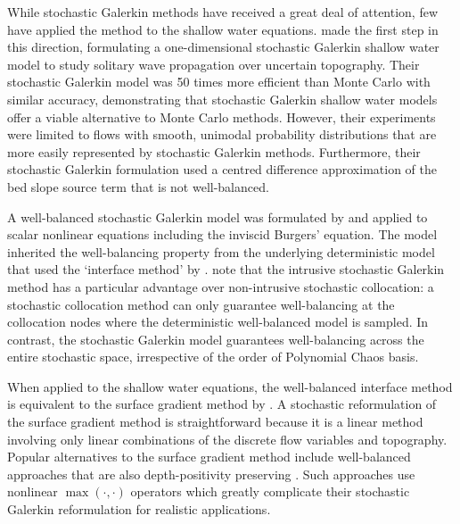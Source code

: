 While stochastic Galerkin methods have received a great deal of attention, few have applied the method to the shallow water equations.
\citet{ge2008} made the first step in this direction, formulating a one-dimensional stochastic Galerkin shallow water model to study solitary wave propagation over uncertain topography.
Their stochastic Galerkin model was 50 times more efficient than Monte Carlo with similar accuracy, demonstrating that stochastic Galerkin shallow water models offer a viable alternative to Monte Carlo methods.
However, their experiments were limited to flows with smooth, unimodal probability distributions that are more easily represented by stochastic Galerkin methods.
Furthermore, their stochastic Galerkin formulation used a centred difference approximation of the bed slope source term that is not well-balanced.

A well-balanced stochastic Galerkin model was formulated by \citet{jin2016} and applied to scalar nonlinear equations including the inviscid Burgers' equation.
The model inherited the well-balancing property from the underlying deterministic model that used the `interface method' by \citet{jin2001}.
\citet{jin2016} note that the intrusive stochastic Galerkin method has a particular advantage over non-intrusive stochastic collocation:
a stochastic collocation method can only guarantee well-balancing at the collocation nodes where the deterministic well-balanced model is sampled.
In contrast, the stochastic Galerkin model guarantees well-balancing across the entire stochastic space, irrespective of the order of Polynomial Chaos basis.

When applied to the shallow water equations, the well-balanced interface method is equivalent to the surface gradient method by \citet{zhou2001}.
A stochastic reformulation of the surface gradient method is straightforward because it is a linear method involving only linear combinations of the discrete flow variables and topography.
Popular alternatives to the surface gradient method include well-balanced approaches that are also depth-positivity preserving \citep{audusse2004,liang-marche2009}.
Such approaches use nonlinear $\max(\cdot, \cdot)$ operators which greatly complicate their stochastic Galerkin reformulation for realistic applications.

